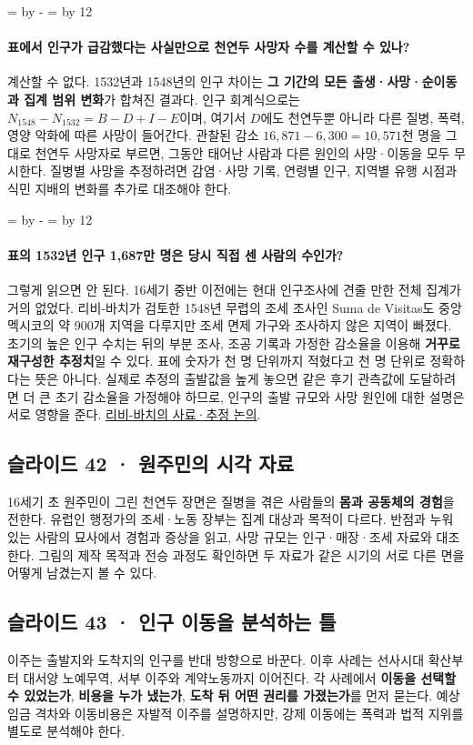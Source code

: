 \documentclass[10pt,a4paper]{article}
\newcommand{\ReserveQuestionSpace}{%
  \par\begingroup
  \dimen0=\pagegoal \advance\dimen0 by -\pagetotal
  \dimen2=\baselineskip \multiply\dimen2 by 12
  \ifdim\dimen0<\dimen2 \newpage\fi
  \endgroup}
\begin{document}
\ReserveQuestionSpace
\paragraph{표에서 인구가 급감했다는 사실만으로 천연두 사망자 수를 계산할 수 있나?}
계산할 수 없다. 1532년과 1548년의 인구 차이는 \textbf{그 기간의 모든 출생·사망·순이동과 집계 범위 변화}가 합쳐진 결과다. 인구 회계식으로는 $N_{1548}-N_{1532}=B-D+I-E$이며, 여기서 $D$에도 천연두뿐 아니라 다른 질병, 폭력, 영양 악화에 따른 사망이 들어간다. 관찰된 감소 $16{,}871-6{,}300=10{,}571$천 명을 그대로 천연두 사망자로 부르면, 그동안 태어난 사람과 다른 원인의 사망·이동을 모두 무시한다. 질병별 사망을 추정하려면 감염·사망 기록, 연령별 인구, 지역별 유행 시점과 식민 지배의 변화를 추가로 대조해야 한다.\par

\ReserveQuestionSpace
\paragraph{표의 1532년 인구 1,687만 명은 당시 직접 센 사람의 수인가?}
그렇게 읽으면 안 된다. 16세기 중반 이전에는 현대 인구조사에 견줄 만한 전체 집계가 거의 없었다. 리비-바치가 검토한 1548년 무렵의 조세 조사인 Suma de Visitas도 중앙 멕시코의 약 900개 지역을 다루지만 조세 면제 가구와 조사하지 않은 지역이 빠졌다. 초기의 높은 인구 수치는 뒤의 부분 조사, 조공 기록과 가정한 감소율을 이용해 \textbf{거꾸로 재구성한 추정치}일 수 있다. 표에 숫자가 천 명 단위까지 적혔다고 천 명 단위로 정확하다는 뜻은 아니다. 실제로 추정의 출발값을 높게 놓으면 같은 후기 관측값에 도달하려면 더 큰 초기 감소율을 가정해야 하므로, 인구의 출발 규모와 사망 원인에 대한 설명은 서로 영향을 준다. \href{https://labdisia.disia.unifi.it/livi/pubblicazioni/depopulation-of-hispanic-america.pdf}{리비-바치의 사료·추정 논의}.\par

\subsection{슬라이드 42 · 원주민의 시각 자료}
16세기 초 원주민이 그린 천연두 장면은 질병을 겪은 사람들의 \textbf{몸과 공동체의 경험}을 전한다. 유럽인 행정가의 조세·노동 장부는 집계 대상과 목적이 다르다. 반점과 누워 있는 사람의 묘사에서 경험과 증상을 읽고, 사망 규모는 인구·매장·조세 자료와 대조한다. 그림의 제작 목적과 전승 과정도 확인하면 두 자료가 같은 시기의 서로 다른 면을 어떻게 남겼는지 볼 수 있다.\par

\subsection{슬라이드 43 · 인구 이동을 분석하는 틀}
이주는 출발지와 도착지의 인구를 반대 방향으로 바꾼다. 이후 사례는 선사시대 확산부터 대서양 노예무역, 서부 이주와 계약노동까지 이어진다. 각 사례에서 \textbf{이동을 선택할 수 있었는가}, \textbf{비용을 누가 냈는가}, \textbf{도착 뒤 어떤 권리를 가졌는가}를 먼저 묻는다. 예상 임금 격차와 이동비용은 자발적 이주를 설명하지만, 강제 이동에는 폭력과 법적 지위를 별도로 분석해야 한다.\par
\end{document}
